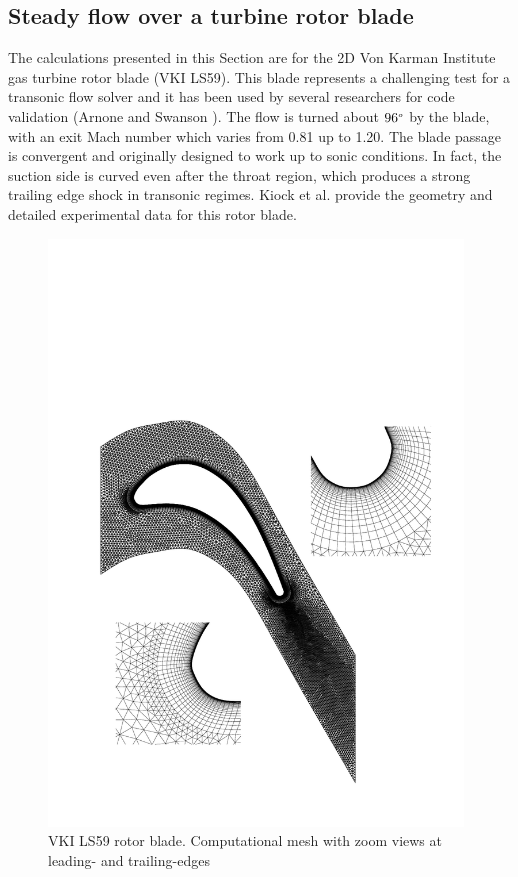 %
%
%
\subsection{Steady flow over a turbine rotor blade}
\label{VKI_LS59.subsec}
%
 The calculations presented in this Section are for the 2D Von Karman Institute gas
 turbine rotor blade (VKI LS59).
 This blade represents a challenging test for a transonic flow solver and
 it has been used by several researchers for code validation
 (Arnone and Swanson ).
 The flow is turned
 about $96^{\mbox{\tiny $o$}}$ by the blade, with an exit Mach number which varies from 0.81
 up to 1.20. The blade passage is convergent and originally designed to work
 up to sonic conditions. In fact, the suction side is curved even after the throat
 region, which produces a strong trailing edge shock in transonic regimes.
 Kiock et al. \citeyear{Kiock:1} provide the geometry and
 detailed experimental data for this rotor blade.
%
\begin{figure}[ht]
 \centerline{\includegraphics[width=110mm,clip=t]{CHAP_NONLIN/FIGURE/vki_mesh_1.pdf}}
 \caption{VKI LS59 rotor blade. Computational mesh with zoom views at leading- and
          trailing-edges}
 \label{vki_mesh_1.fig}
\end{figure}
%

